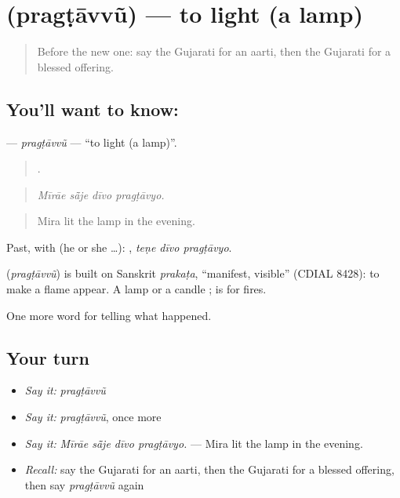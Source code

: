 \section[\texorpdfstring{\gu{પ્રગટાવવું} (pragṭāvvũ)}{પ્રગટાવવું (pragṭāvvũ)}]{ (pragṭāvvũ) — to light (a lamp)}

\label{lesson:GU-C328-pragtavvu}



\begin{quote}
Before the new one: say the Gujarati for an aarti, then the Gujarati for a blessed offering.
\end{quote}

\subsection*{You'll want to know: }
\textbf{} — \emph{pragṭāvvũ} — \textquotedblleft{}to light (a lamp)\textquotedblright{}.

\begin{quote}
   .
\end{quote}

\begin{quote}
\emph{Mīrāe sā̃je dīvo pragṭāvyo.}
\end{quote}

\begin{quote}
Mira lit the lamp in the evening.
\end{quote}

Past, with  (he or she …):   , \emph{teṇe dīvo pragṭāvyo}.

\begin{cousinweb}
\textbf{} (\emph{pragṭāvvũ}) is built on Sanskrit \emph{prakaṭa}, \textquotedblleft{}manifest, visible\textquotedblright{} (CDIAL 8428): to make a flame appear. A lamp or a candle \textbf{ }; \textbf{} is for fires.
\end{cousinweb}

\begin{grammarlens}[title={What you've built}]
One more word for telling what happened.
\end{grammarlens}

\subsection*{Your turn}
\begin{itemize}
\raggedright
  \item \emph{Say it:} \emph{pragṭāvvũ}
  \item \emph{Say it:} \emph{pragṭāvvũ}, once more
  \item \emph{Say it:} \emph{Mīrāe sā̃je dīvo pragṭāvyo.} — Mira lit the lamp in the evening.
  \item \emph{Recall:} say the Gujarati for an aarti, then the Gujarati for a blessed offering, then say \emph{pragṭāvvũ} again
\end{itemize}

